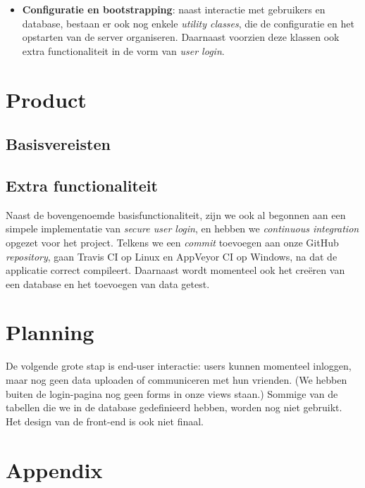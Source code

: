 \documentclass[12pt,a4paper]{article}
\begin{document}
\begin{itemize}
\item \textbf{Configuratie en bootstrapping}: naast interactie met gebruikers en database, bestaan er ook nog enkele \emph{utility classes}, die de configuratie en het opstarten van de server organiseren. Daarnaast voorzien deze klassen ook extra functionaliteit in de vorm van \emph{user login}. 

\end{itemize}

\section{Product}

\subsection{Basisvereisten}

\subsection{Extra functionaliteit}

Naast de bovengenoemde basisfunctionaliteit, zijn we ook al begonnen aan een simpele implementatie van \emph{secure user login}, en hebben we \emph{continuous integration} opgezet voor het project. Telkens we een \emph{commit} toevoegen aan onze GitHub \emph{repository}, gaan Travis CI op Linux en AppVeyor CI op Windows, na dat de applicatie correct compileert. Daarnaast wordt momenteel ook het cre\"eren van een database en het toevoegen van data getest.

\section{Planning}
De volgende grote stap is end-user interactie: users kunnen momenteel inloggen, 
maar nog geen data uploaden of communiceren met hun vrienden.
(We hebben buiten de login-pagina nog geen forms in onze views staan.)
Sommige van de tabellen die we in de database gedefinieerd hebben, worden nog 
niet gebruikt. Het design van de front-end is ook niet finaal.

\section{Appendix}
\end{document}

